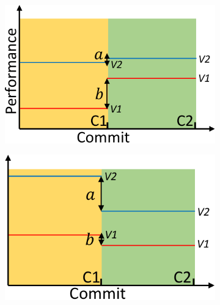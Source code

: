 \begin{figure}[t]
\begin{subfigure}{0.22\textwidth}
                \includegraphics[width=\linewidth]{Figures/background-c.pdf}
                \caption{}
                \label{fig:description-c}
        \end{subfigure}%
        \begin{subfigure}{0.22\textwidth}
                \includegraphics[width=\linewidth]{Figures/background-d.pdf}
                \caption{}
                \label{fig:description-d}
        \end{subfigure}%
	\caption{%
}
\end{figure}
